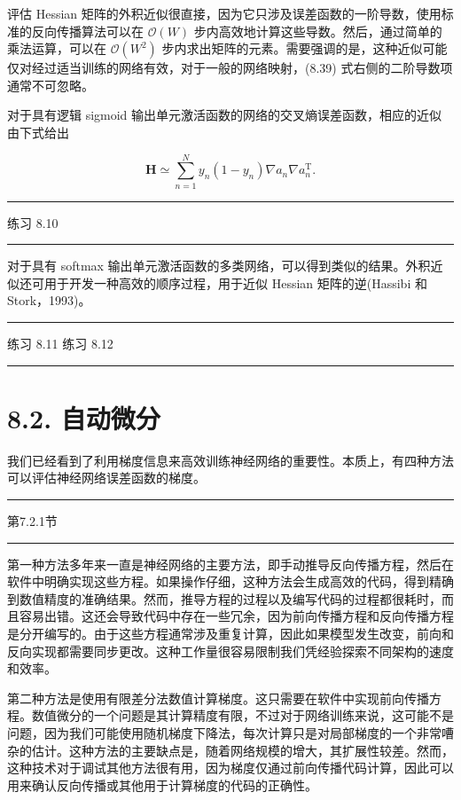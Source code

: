 \documentclass[10pt]{article}
\newcommand{\HRule}{\begin{center}\rule{0.9\linewidth}{0.2mm}\end{center}}
\begin{document}
评估 Hessian 矩阵的外积近似很直接，因为它只涉及误差函数的一阶导数，使用标准的反向传播算法可以在 \(\mathcal{O}\left( W\right)\) 步内高效地计算这些导数。然后，通过简单的乘法运算，可以在 \(\mathcal{O}\left( {W}^{2}\right)\) 步内求出矩阵的元素。需要强调的是，这种近似可能仅对经过适当训练的网络有效，对于一般的网络映射，(8.39) 式右侧的二阶导数项通常不可忽略。

对于具有逻辑 sigmoid 输出单元激活函数的网络的交叉熵误差函数，相应的近似由下式给出

\[
\mathbf{H} \simeq  \mathop{\sum }\limits_{{n = 1}}^{N}{y}_{n}\left( {1 - {y}_{n}}\right) \nabla {a}_{n}\nabla {a}_{n}^{\mathrm{T}}. \tag{8.41}
\]

\HRule

练习 8.10

\HRule

对于具有 softmax 输出单元激活函数的多类网络，可以得到类似的结果。外积近似还可用于开发一种高效的顺序过程，用于近似 Hessian 矩阵的逆(Hassibi 和 Stork，1993)。

\HRule

练习 8.11 练习 8.12

\HRule

\section*{8.2. 自动微分}

我们已经看到了利用梯度信息来高效训练神经网络的重要性。本质上，有四种方法可以评估神经网络误差函数的梯度。

\HRule

第7.2.1节

\HRule

第一种方法多年来一直是神经网络的主要方法，即手动推导反向传播方程，然后在软件中明确实现这些方程。如果操作仔细，这种方法会生成高效的代码，得到精确到数值精度的准确结果。然而，推导方程的过程以及编写代码的过程都很耗时，而且容易出错。这还会导致代码中存在一些冗余，因为前向传播方程和反向传播方程是分开编写的。由于这些方程通常涉及重复计算，因此如果模型发生改变，前向和反向实现都需要同步更改。这种工作量很容易限制我们凭经验探索不同架构的速度和效率。

第二种方法是使用有限差分法数值计算梯度。这只需要在软件中实现前向传播方程。数值微分的一个问题是其计算精度有限，不过对于网络训练来说，这可能不是问题，因为我们可能使用随机梯度下降法，每次计算只是对局部梯度的一个非常嘈杂的估计。这种方法的主要缺点是，随着网络规模的增大，其扩展性较差。然而，这种技术对于调试其他方法很有用，因为梯度仅通过前向传播代码计算，因此可以用来确认反向传播或其他用于计算梯度的代码的正确性。
\end{document}
